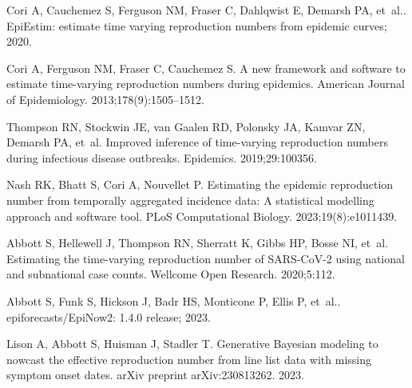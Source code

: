 \documentclass[10pt,letterpaper]{article}
\begin{document}
\nolinenumbers

%
%
% 

\begin{thebibliography}{10}

  Cori A, Cauchemez S, Ferguson NM, Fraser C, Dahlqwist E, Demarsh PA, et~al..
    {EpiEstim}: estimate time varying reproduction numbers from epidemic curves;
    2020.
  
  Cori A, Ferguson NM, Fraser C, Cauchemez S.
  \newblock A new framework and software to estimate time-varying reproduction
    numbers during epidemics.
  \newblock American Journal of Epidemiology. 2013;178(9):1505--1512.
  
  Thompson RN, Stockwin JE, van Gaalen RD, Polonsky JA, Kamvar ZN, Demarsh PA,
    et~al.
  \newblock Improved inference of time-varying reproduction numbers during
    infectious disease outbreaks.
  \newblock Epidemics. 2019;29:100356.
  
  Nash RK, Bhatt S, Cori A, Nouvellet P.
  \newblock Estimating the epidemic reproduction number from temporally
    aggregated incidence data: A statistical modelling approach and software
    tool.
  \newblock PLoS Computational Biology. 2023;19(8):e1011439.
  
  Abbott S, Hellewell J, Thompson RN, Sherratt K, Gibbs HP, Bosse NI, et~al.
  \newblock Estimating the time-varying reproduction number of {SARS-CoV-2} using
    national and subnational case counts.
  \newblock Wellcome Open Research. 2020;5:112.
  
  Abbott S, Funk S, Hickson J, Badr HS, Monticone P, Ellis P, et~al..
    epiforecasts/{EpiNow2}: 1.4.0 release; 2023.
  
  Lison A, Abbott S, Huisman J, Stadler T.
  \newblock Generative {B}ayesian modeling to nowcast the effective reproduction
    number from line list data with missing symptom onset dates.
  \newblock arXiv preprint arXiv:230813262. 2023.
  

\end{thebibliography}
\end{document}
